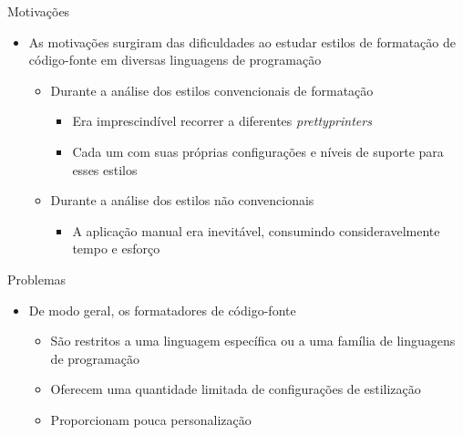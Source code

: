 \documentclass
  [ aspectratio=169,
    english,
    hyperref={citecolor=blue,colorlinks=true,linkcolor=blue,urlcolor=blue},
    brazil]
  {beamer}
\title{\worktitle}
\subtitle{\worksubtitle}
\author{Átila Gama Silva}
\date{\today}
\begin{document}

  \begin{frame}\titlepage\end{frame}


  \begin{frame}{Motivações}
    \begin{itemize}
      \item As motivações surgiram das dificuldades ao estudar estilos de
            formatação de código-fonte em diversas linguagens de programação
            \begin{itemize}
              \item Durante a análise dos estilos convencionais de formatação
                    \begin{itemize}
                      \item Era imprescindível recorrer a diferentes
                            \textit{prettyprinters}
                      \item Cada um com suas próprias configurações e níveis de
                            suporte para esses estilos
                    \end{itemize}
              \item Durante a análise dos estilos não convencionais
                    \begin{itemize}
                      \item A aplicação manual era inevitável, consumindo
                            consideravelmente tempo e esforço
                    \end{itemize}
            \end{itemize}
    \end{itemize}
  \end{frame}


  \begin{frame}{Problemas}
    \begin{itemize}
      \item De modo geral, os formatadores de código-fonte
            \begin{itemize}
              \item São restritos a uma linguagem específica ou a uma família
                    de linguagens de programação
              \item Oferecem uma quantidade limitada de configurações de
                    estilização
              \item Proporcionam pouca personalização
            \end{itemize}
    \end{itemize}
  \end{frame}
\end{document}

